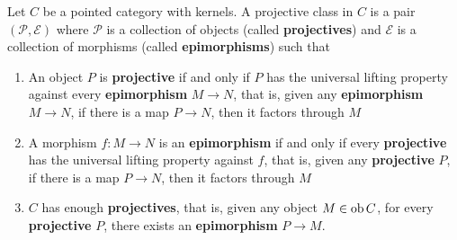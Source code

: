 \documentclass{article}
\begin{document}
\begin{definition}
    Let $C$ be a pointed category with kernels. A projective class in $C$ is a pair $(\mathcal{P}, \mathcal{E})$ where $\mathcal{P}$ is a collection of objects (called \textbf{projectives}) and $\mathcal{E}$ is a collection of morphisms (called \textbf{epimorphisms}) such that
    \begin{enumerate}
        \item An object $P$ is \textbf{projective} if and only if $P$ has the universal lifting property against every \textbf{epimorphism} $M \to N$, that is, given any \textbf{epimorphism} $M \to N$, if there is a map $P \to N$, then it factors through $M$
        \begin{center}
        \end{center}

        \item A morphism $f: M \to N$ is an \textbf{epimorphism} if and only if every \textbf{projective} has the universal lifting property against $f$, that is, given any \textbf{projective} $P$, if there is a map $P \to N$, then it factors through $M$

        \begin{center}
        \end{center}

        \item $C$ has enough \textbf{projectives}, that is, given any object $M \in \operatorname{ob} C$, for every \textbf{projective} $P$, there exists an \textbf{epimorphism} $P \to M$.
    \end{enumerate}
\end{definition}
\end{document}
